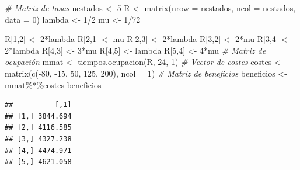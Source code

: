 \documentclass[
]{book}
\newenvironment{Shaded}{\begin{snugshade}}{\end{snugshade}}
\newcommand{\AttributeTok}[1]{\textcolor[rgb]{0.77,0.63,0.00}{#1}}
\newcommand{\CommentTok}[1]{\textcolor[rgb]{0.56,0.35,0.01}{\textit{#1}}}
\newcommand{\DecValTok}[1]{\textcolor[rgb]{0.00,0.00,0.81}{#1}}
\newcommand{\FunctionTok}[1]{\textcolor[rgb]{0.00,0.00,0.00}{#1}}
\newcommand{\NormalTok}[1]{#1}
\newcommand{\OtherTok}[1]{\textcolor[rgb]{0.56,0.35,0.01}{#1}}
\newcommand{\SpecialCharTok}[1]{\textcolor[rgb]{0.00,0.00,0.00}{#1}}
\theoremstyle{definition}
\theoremstyle{definition}
\theoremstyle{definition}
\theoremstyle{definition}
\theoremstyle{remark}
\begin{document}
\begin{Shaded}
\begin{Highlighting}[]
\CommentTok{\# Matriz de tasas}
\NormalTok{nestados }\OtherTok{\textless{}{-}} \DecValTok{5}
\NormalTok{R }\OtherTok{\textless{}{-}} \FunctionTok{matrix}\NormalTok{(}\AttributeTok{nrow =}\NormalTok{ nestados, }\AttributeTok{ncol =}\NormalTok{ nestados, }\AttributeTok{data =} \DecValTok{0}\NormalTok{)}
\NormalTok{lambda }\OtherTok{\textless{}{-}} \DecValTok{1}\SpecialCharTok{/}\DecValTok{2}
\NormalTok{mu }\OtherTok{\textless{}{-}} \DecValTok{1}\SpecialCharTok{/}\DecValTok{72} 

\NormalTok{R[}\DecValTok{1}\NormalTok{,}\DecValTok{2}\NormalTok{] }\OtherTok{\textless{}{-}} \DecValTok{2}\SpecialCharTok{*}\NormalTok{lambda }
\NormalTok{R[}\DecValTok{2}\NormalTok{,}\DecValTok{1}\NormalTok{] }\OtherTok{\textless{}{-}}\NormalTok{ mu }
\NormalTok{R[}\DecValTok{2}\NormalTok{,}\DecValTok{3}\NormalTok{] }\OtherTok{\textless{}{-}} \DecValTok{2}\SpecialCharTok{*}\NormalTok{lambda }
\NormalTok{R[}\DecValTok{3}\NormalTok{,}\DecValTok{2}\NormalTok{] }\OtherTok{\textless{}{-}} \DecValTok{2}\SpecialCharTok{*}\NormalTok{mu }
\NormalTok{R[}\DecValTok{3}\NormalTok{,}\DecValTok{4}\NormalTok{] }\OtherTok{\textless{}{-}} \DecValTok{2}\SpecialCharTok{*}\NormalTok{lambda }
\NormalTok{R[}\DecValTok{4}\NormalTok{,}\DecValTok{3}\NormalTok{] }\OtherTok{\textless{}{-}} \DecValTok{3}\SpecialCharTok{*}\NormalTok{mu }
\NormalTok{R[}\DecValTok{4}\NormalTok{,}\DecValTok{5}\NormalTok{] }\OtherTok{\textless{}{-}}\NormalTok{ lambda}
\NormalTok{R[}\DecValTok{5}\NormalTok{,}\DecValTok{4}\NormalTok{] }\OtherTok{\textless{}{-}} \DecValTok{4}\SpecialCharTok{*}\NormalTok{mu}
\CommentTok{\# Matriz de ocupación}
\NormalTok{mmat }\OtherTok{\textless{}{-}} \FunctionTok{tiempos.ocupacion}\NormalTok{(R, }\DecValTok{24}\NormalTok{, }\DecValTok{1}\NormalTok{)}
\CommentTok{\# Vector de costes}
\NormalTok{costes }\OtherTok{\textless{}{-}} \FunctionTok{matrix}\NormalTok{(}\FunctionTok{c}\NormalTok{(}\SpecialCharTok{{-}}\DecValTok{80}\NormalTok{, }\SpecialCharTok{{-}}\DecValTok{15}\NormalTok{, }\DecValTok{50}\NormalTok{, }\DecValTok{125}\NormalTok{, }\DecValTok{200}\NormalTok{), }\AttributeTok{ncol =} \DecValTok{1}\NormalTok{)}
\CommentTok{\# Matriz de beneficios}
\NormalTok{beneficios }\OtherTok{\textless{}{-}}\NormalTok{ mmat}\SpecialCharTok{\%*\%}\NormalTok{costes}
\NormalTok{beneficios}
\end{Highlighting}
\end{Shaded}

\begin{verbatim}
##          [,1]
## [1,] 3844.694
## [2,] 4116.585
## [3,] 4327.238
## [4,] 4474.971
## [5,] 4621.058
\end{verbatim}
\end{document}
